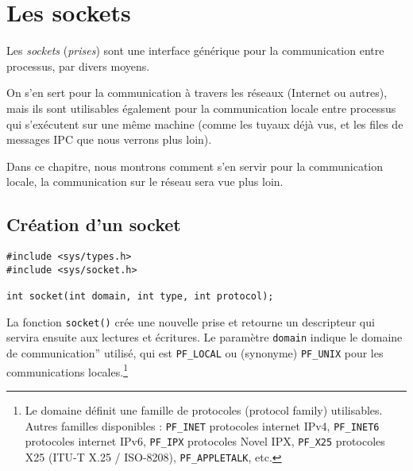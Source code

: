 
\section{Les sockets}

\label{sockets}


Les \emph{sockets} (\emph{prises}) sont une interface générique
pour la communication entre processus, par divers moyens.


On s'en sert pour la communication à travers les réseaux (Internet ou
autres), mais ils sont utilisables également pour la communication
locale entre processus qui s'exécutent sur une même machine (comme les
tuyaux déjà vus, et les files de messages IPC que nous verrons plus
loin).

Dans ce chapitre, nous montrons comment s'en servir pour la
communication locale, la communication sur le réseau sera vue plus
loin.


\subsection{Création d'un socket}


\extrait
\begin{lstlisting}
#include <sys/types.h>
#include <sys/socket.h>

int socket(int domain, int type, int protocol);
\end{lstlisting}



La fonction \texttt{socket()} crée une nouvelle prise et retourne un
descripteur qui servira ensuite aux lectures et écritures. Le
paramètre \texttt{domain} indique le domaine de communication''
utilisé, qui est \texttt{PF\_LOCAL} ou (synonyme) \texttt{PF\_UNIX} pour
les communications locales.\footnote{ Le domaine définit une famille
de protocoles (protocol family) utilisables. Autres familles
disponibles : \texttt{PF\_INET} protocoles internet IPv4,
\texttt{PF\_INET6} protocoles internet IPv6, \texttt{PF\_IPX} protocoles
Novel IPX, \texttt{PF\_X25} protocoles X25 (ITU-T X.25 / ISO-8208),
\texttt{PF\_APPLETALK}, etc.}


